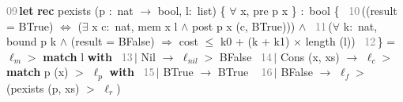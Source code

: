 \begin{flushleft}
\noindent\textrm{\textcolor{Gray}{09\;\;\,}}\hspace{0.5em}\hspace*{0.00000em}\textbf{let} \textbf{rec} pexists (p \ensuremath{\colon} nat \ensuremath{\rightarrow} bool, l\ensuremath{\colon} list) \{ \ensuremath{\forall} x, pre p x \} \ensuremath{\colon} bool \{~\linebreak
\noindent\textrm{\textcolor{Gray}{10\;\;\,}}\hspace{0.5em}\hspace*{0.50000em}((result = BTrue) \ensuremath{\Leftrightarrow} (\ensuremath{\exists} x c\ensuremath{\colon} nat, mem x l \ensuremath{\wedge} post p x (c, BTrue))) \ensuremath{\wedge}~\linebreak
\noindent\textrm{\textcolor{Gray}{11\;\;\,}}\hspace{0.5em}\hspace*{0.50000em}(\ensuremath{\forall} k\ensuremath{\colon} nat, bound p k \ensuremath{\wedge} (result = BFalse) \ensuremath{\Rightarrow} cost \ensuremath{\le} k0 + (k + k1) \ensuremath{\times} length (l))~\linebreak
\noindent\textrm{\textcolor{Gray}{12\;\;\,}}\hspace{0.5em}\hspace*{0.00000em}\} = \ensuremath{\ell_{m}}\ensuremath{>} \textbf{match} l \textbf{with}~\linebreak
\noindent\textrm{\textcolor{Gray}{13\;\;\,}}\hspace{0.5em}\hspace*{1.00000em}\ensuremath{|} Nil \ensuremath{\rightarrow} \ensuremath{\ell_{nil}}\ensuremath{>} BFalse~\linebreak
\noindent\textrm{\textcolor{Gray}{14\;\;\,}}\hspace{0.5em}\hspace*{1.00000em}\ensuremath{|} Cons (x, xs) \ensuremath{\rightarrow} \ensuremath{\ell_{c}}\ensuremath{>} \textbf{match} p (x) \ensuremath{>} \ensuremath{\ell_{p}} \textbf{with}~\linebreak
\noindent\textrm{\textcolor{Gray}{15\;\;\,}}\hspace{0.5em}\hspace*{10.50000em}\ensuremath{|} BTrue \ensuremath{\rightarrow} BTrue ~\linebreak
\noindent\textrm{\textcolor{Gray}{16\;\;\,}}\hspace{0.5em}\hspace*{10.50000em}\ensuremath{|} BFalse \ensuremath{\rightarrow} \ensuremath{\ell_{f}}\ensuremath{>} (pexists (p, xs) \ensuremath{>} \ensuremath{\ell_{r}})
\end{flushleft}\medskip\egroup\noindent
